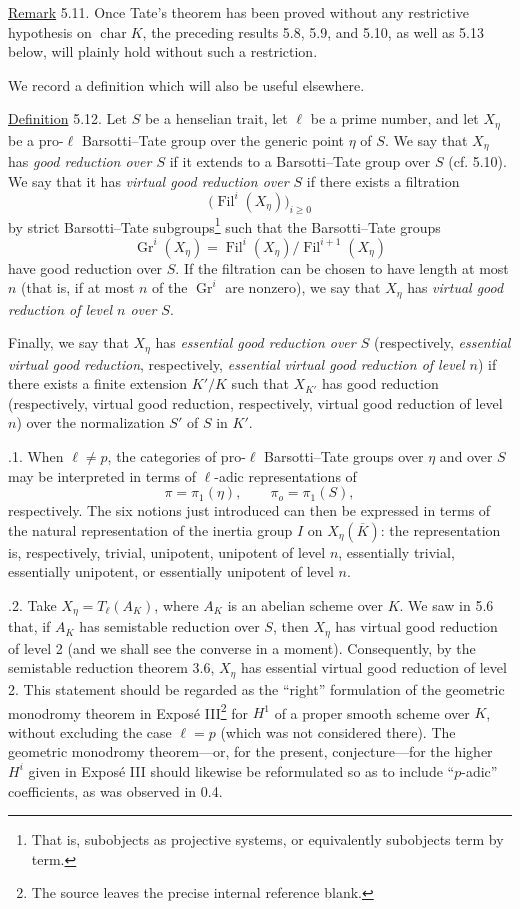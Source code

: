 \medskip
\noindent
\underline{Remark} 5.11. Once Tate's theorem has been proved without any
restrictive hypothesis on $\operatorname{char}K$, the preceding results
5.8, 5.9, and 5.10, as well as 5.13 below, will plainly hold without
such a restriction.

We record a definition which will also be useful elsewhere.

\medskip
\noindent
\underline{Definition} 5.12. Let $S$ be a henselian trait, let $\ell$ be
a prime number, and let $X_\eta$ be a pro-$\ell$ Barsotti--Tate group
over the generic point $\eta$ of $S$. We say that $X_\eta$ has
\emph{good reduction over $S$} if it extends to a Barsotti--Tate group
over $S$ (cf. 5.10). We say that it has \emph{virtual good reduction
over $S$} if there exists a filtration
\[
 \bigl(\operatorname{Fil}^i(X_\eta)\bigr)_{i\geq0}
\]
by strict Barsotti--Tate subgroups\footnote{That is, subobjects as
projective systems, or equivalently subobjects term by term.} such that
the Barsotti--Tate groups
\[
 \operatorname{Gr}^i(X_\eta)=
 \operatorname{Fil}^i(X_\eta)/\operatorname{Fil}^{i+1}(X_\eta)
\]
have good reduction over $S$. If the filtration can be chosen to have
length at most $n$ (that is, if at most $n$ of the
$\operatorname{Gr}^i$ are nonzero), we say that $X_\eta$ has
\emph{virtual good reduction of level $n$ over $S$}.

Finally, we say that $X_\eta$ has \emph{essential good reduction over
$S$} (respectively, \emph{essential virtual good reduction},
respectively, \emph{essential virtual good reduction of level $n$}) if
there exists a finite extension $K'/K$ such that $X_{K'}$ has good
reduction (respectively, virtual good reduction, respectively, virtual
good reduction of level $n$) over the normalization $S'$ of $S$ in
$K'$.

\medskip
{}.1. When $\ell\neq p$, the categories of pro-$\ell$
Barsotti--Tate groups over $\eta$ and over $S$ may be interpreted in
terms of $\ell$-adic representations of
\[
 \pi=\pi_1(\eta), \qquad \pi_o=\pi_1(S),
\]
respectively. The six notions just introduced can then be expressed in
terms of the natural representation of the inertia group $I$ on
$X_\eta(\overline K)$: the representation is, respectively, trivial,
unipotent, unipotent of level $n$, essentially trivial, essentially
unipotent, or essentially unipotent of level $n$.

\medskip
{}.2. Take $X_\eta=T_\ell(A_K)$, where $A_K$ is an abelian scheme
over $K$. We saw in 5.6 that, if $A_K$ has semistable reduction over
$S$, then $X_\eta$ has virtual good reduction of level 2 (and we shall
see the converse in a moment). Consequently, by the semistable
reduction theorem 3.6, $X_\eta$ has essential virtual good reduction of
level 2. This statement should be regarded as the ``right'' formulation
of the geometric monodromy theorem in Expos\'e III\footnote{The source
leaves the precise internal reference blank.} for $H^1$ of a proper
smooth scheme over $K$, without excluding the case $\ell=p$ (which was
not considered there). The geometric monodromy theorem---or, for the
present, conjecture---for the higher $H^i$ given in Expos\'e III should
likewise be reformulated so as to include ``$p$-adic'' coefficients, as
was observed in 0.4.

